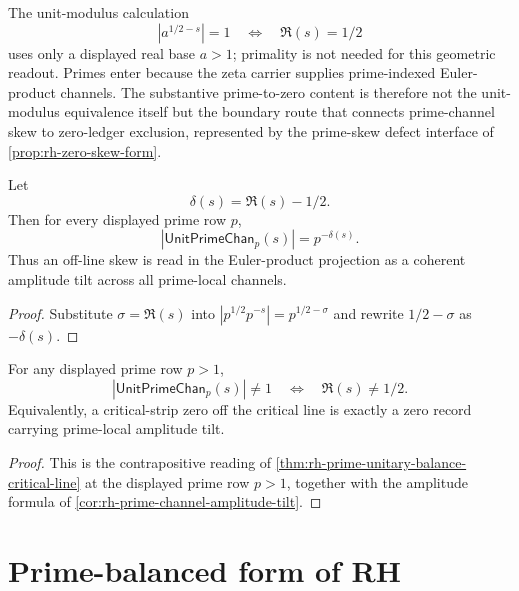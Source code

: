 \begin{remark}
\label{rem:rh-prime-unitary-scope}
The unit-modulus calculation
$$
|a^{1/2-s}|=1\quad\Longleftrightarrow\quad \Re(s)=1/2
$$
uses only a displayed real base $a>1$; primality is not needed for this
geometric readout. Primes enter because the zeta carrier supplies
prime-indexed Euler-product channels. The substantive prime-to-zero content is
therefore not the unit-modulus equivalence itself but the boundary route that
connects prime-channel skew to zero-ledger exclusion, represented by the
prime-skew defect interface of \autoref{prop:rh-zero-skew-form}.
\end{remark}

\begin{corollary}
\label{cor:rh-prime-channel-amplitude-tilt}
Let
$$
\delta(s)=\Re(s)-1/2.
$$
Then for every displayed prime row $p$,
$$
\left|\mathsf{UnitPrimeChan}_p(s)\right|=p^{-\delta(s)}.
$$
Thus an off-line skew is read in the Euler-product projection as a coherent
amplitude tilt across all prime-local channels.
\end{corollary}

\begin{proof}
Substitute $\sigma=\Re(s)$ into
$\left|p^{1/2}p^{-s}\right|=p^{1/2-\sigma}$ and rewrite
$1/2-\sigma$ as $-\delta(s)$.
\end{proof}

\begin{corollary}
\label{cor:rh-prime-channel-tilt-detects-offline}
For any displayed prime row $p>1$,
$$
\left|\mathsf{UnitPrimeChan}_p(s)\right|\neq 1
\quad\Longleftrightarrow\quad
\Re(s)\neq 1/2.
$$
Equivalently, a critical-strip zero off the critical line is exactly a
zero record carrying prime-local amplitude tilt.
\end{corollary}

\begin{proof}
This is the contrapositive reading of
\autoref{thm:rh-prime-unitary-balance-critical-line} at the displayed prime
row $p>1$, together with the amplitude formula of
\autoref{cor:rh-prime-channel-amplitude-tilt}.
\end{proof}

\section{Prime-balanced form of RH}
\label{sec:rh-prime-balanced-form}

